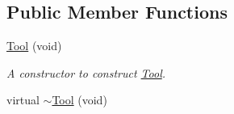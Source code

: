 \subsection*{Public Member Functions}
\begin{DoxyCompactItemize}
\item 
\hyperlink{classimage__tools_1_1Tool_a741e7b33ffa84f149eec76b2084dbd8a}{Tool} (void)\hypertarget{classimage__tools_1_1Tool_a741e7b33ffa84f149eec76b2084dbd8a}{}\label{classimage__tools_1_1Tool_a741e7b33ffa84f149eec76b2084dbd8a}

\begin{DoxyCompactList}\small\item\em A constructor to construct \hyperlink{classimage__tools_1_1Tool}{Tool}. \end{DoxyCompactList}\item 
virtual \hyperlink{classimage__tools_1_1Tool_a9ed5e392fca42f6e9ea7af8c11a92c72}{$\sim$\+Tool} (void)\hypertarget{classimage__tools_1_1Tool_a9ed5e392fca42f6e9ea7af8c11a92c72}{}\label{classimage__tools_1_1Tool_a9ed5e392fca42f6e9ea7af8c11a92c72}


\end{DoxyCompactItemize}
